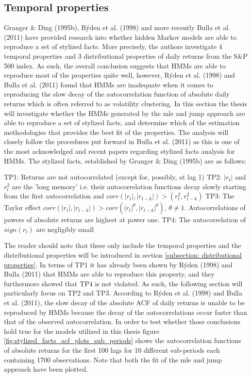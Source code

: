 \subsection{Temporal properties}
\label{Sec: Temporal properties}
Granger \& Ding (1995b), Rýden et al. (1998) and more recently Bulla et al. (2011) have provided research into whether hidden Markov models are able to reproduce a set of stylized facts. More precisely, the authors investigate 4 temporal properties and 3 distributional properties of daily returns from the S\&P 500 index. As such, the overall conclusion suggests that HMMs are able to reproduce most of the properties quite well, however, Rýden et al. (1998) and Bulla et al. (2011) found that HMMs are inadequate when it comes to reproducing the slow decay of the autocorrelation function of absolute daily returns which is often referred to as volatility clustering. In this section the thesis will investigate whether the HMMs generated by the mle and jump approach are able to reproduce a set of stylized facts, and determine which of the estimation methodologies that provides the best fit of the properties. The analysis will closely follow the procedures put forward in Bulla et al. (2011) as this is one of the most acknowledged and recent papers regarding stylized facts analysis for HMMs. The stylized facts, established by Granger \& Ding (1995b) are as follows: 

TP1: Returns are not autocorrelated (except for, possibly, at lag 1) \newline
TP2: $|r_t|$ and $r_t^2$ are the 'long memory' i.e. their autocorrelation functions decay slowly starting from the first autocorrelation and $corr(|r_t|, |r_{t-k}|) > (r_t^2, r^2_{t-k})$ \newline
TP3: The Taylor effect $corr(|r_t|, |r_{t-k}|) > corr(|r_t|^{\theta}, |r_{t-k}|^{\theta})$, $\theta \neq 1$. Autocorrelations of powers of absolute returns are highest at power one. \newline
TP4: The autocorrelation of $sign(r_t)$ are negligibly small

The reader should note that these only include the temporal properties and the distributional properties will be introduced in section \ref{subsection: distributional properties}. In terms of TP1 it has already been shown by Rýden (1998) and Bulla (2011) that HMMs are able to reproduce this property, and they furthermore showed that TP4 is not violated. As such, the following section will particularly focus on TP2 and TP3. According to Rýden et al. (1998) and Bulla et al. (2011), the slow decay of the absolute ACF of daily returns is unable to be reproduced by HMMs because the decay of the autocorrelations occur faster than that of the observed autocorrelation. In order to test whether those conclusions hold true for the models utilized in this thesis figure \ref{fig:stylized_facts_acf_plots_sub_periods} shows the autocorrelation functions of absolute returns for the first 100 lags for 10 different sub-periods each containing 1700 observations. Note that both the fit of the mle and jump approach have been plotted.   

